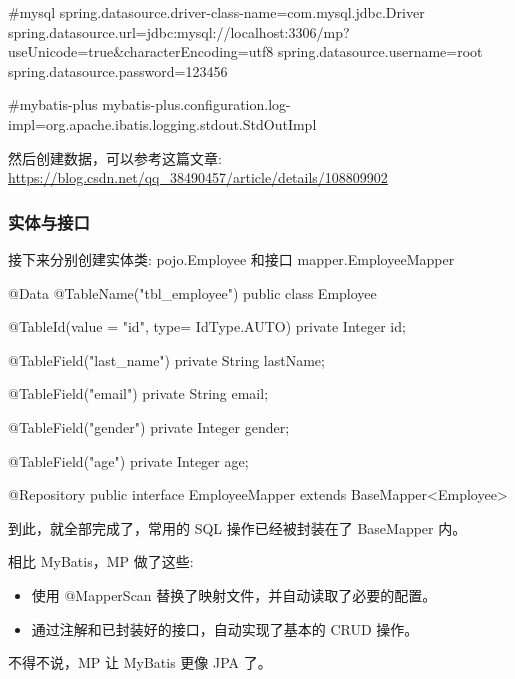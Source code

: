 \begin{xml}
#mysql
spring.datasource.driver-class-name=com.mysql.jdbc.Driver
spring.datasource.url=jdbc:mysql://localhost:3306/mp?useUnicode=true&characterEncoding=utf8
spring.datasource.username=root
spring.datasource.password=123456

#mybatis-plus
mybatis-plus.configuration.log-impl=org.apache.ibatis.logging.stdout.StdOutImpl
\end{xml}

然后创建数据，可以参考这篇文章: \url{https://blog.csdn.net/qq_38490457/article/details/108809902}

\subsubsection*{实体与接口}

接下来分别创建实体类: pojo.Employee 和接口 mapper.EmployeeMapper

\begin{Java}
@Data
@TableName("tbl_employee")
public class Employee {
    @TableId(value = "id", type= IdType.AUTO)
    private Integer id;

    @TableField("last_name")
    private String lastName;

    @TableField("email")
    private String email;

    @TableField("gender")
    private Integer gender;

    @TableField("age")
    private Integer age;
}
\end{Java}

\begin{Java}
@Repository
public interface EmployeeMapper extends BaseMapper<Employee> {
}
\end{Java}

到此，就全部完成了，常用的 SQL 操作已经被封装在了 BaseMapper 内。

相比 MyBatis，MP 做了这些:
\begin{itemize}
    \item 使用 @MapperScan 替换了映射文件，并自动读取了必要的配置。
    \item 通过注解和已封装好的接口，自动实现了基本的 CRUD 操作。
\end{itemize}

不得不说，MP 让 MyBatis 更像 JPA 了。